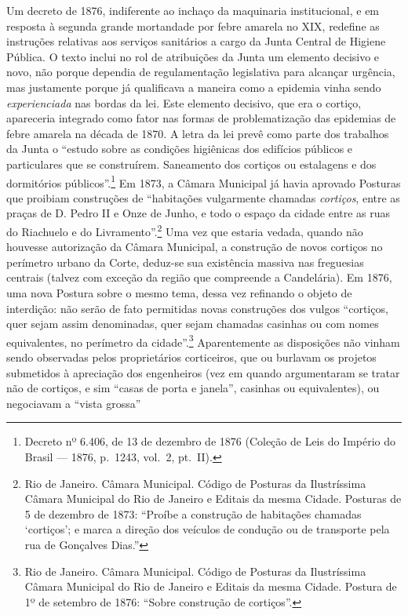 Um decreto de 1876, indiferente ao inchaço da maquinaria institucional,
e em resposta à segunda grande mortandade por febre amarela no XIX,
redefine as instruções relativas aos serviços sanitários a cargo da
Junta Central de Higiene Pública. O texto inclui no rol de atribuições
da Junta um elemento decisivo e novo, não porque dependia de
regulamentação legislativa para alcançar urgência, mas justamente porque
já qualificava a maneira como a epidemia vinha sendo
\textit{experienciada} nas bordas da lei. Este elemento decisivo, que era
o cortiço, apareceria integrado como fator nas formas de problematização
das epidemias de febre amarela na década de 1870. A letra da lei prevê
como parte dos trabalhos da Junta o ``estudo sobre as condições
higiênicas dos edifícios públicos e particulares que se construírem.
Saneamento dos cortiços ou estalagens e dos dormitórios
públicos''.\footnote{Decreto nº 6.406, de 13 de dezembro de 1876
  (Coleção de Leis do Império do Brasil --- 1876, p.~1243, vol.~2,
  pt.~II).} Em 1873, a Câmara Municipal já havia aprovado Posturas que
proibiam construções de ``habitações vulgarmente chamadas
\textit{cortiços}, entre as praças de D. Pedro II e Onze de Junho, e todo
o espaço da cidade entre as ruas do Riachuelo e do
Livramento''.\footnote{Rio de Janeiro. Câmara Municipal. Código de
  Posturas da Ilustríssima Câmara Municipal do Rio de Janeiro e Editais
  da mesma Cidade. Posturas de 5 de dezembro de 1873: ``Proíbe a
  construção de habitações chamadas `cortiços'; e marca a direção dos
  veículos de condução ou de transporte pela rua de Gonçalves Dias.''}
Uma vez que estaria vedada, quando não houvesse autorização da Câmara
Municipal, a construção de novos cortiços no perímetro urbano da Corte,
deduz-se sua existência massiva nas freguesias centrais (talvez com
exceção da região que compreende a Candelária). Em 1876, uma nova
Postura sobre o mesmo tema, dessa vez refinando o objeto de interdição:
não serão de fato permitidas novas construções dos vulgos ``cortiços,
quer sejam assim denominadas, quer sejam chamadas casinhas ou com nomes
equivalentes, no perímetro da cidade''.\footnote{Rio de Janeiro. Câmara
  Municipal. Código de Posturas da Ilustríssima Câmara Municipal do Rio
  de Janeiro e Editais da mesma Cidade. Postura de 1º de setembro de
  1876: ``Sobre construção de cortiços''.} Aparentemente as disposições
não vinham sendo observadas pelos proprietários corticeiros, que ou
burlavam os projetos submetidos à apreciação dos engenheiros (vez em
quando argumentaram se tratar não de cortiços, e sim ``casas de porta e
janela'', casinhas ou equivalentes), ou negociavam a ``vista grossa''
